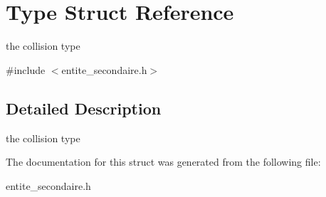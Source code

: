 \hypertarget{structType}{}\section{Type Struct Reference}
\label{structType}


the collision type  




{\ttfamily \#include $<$entite\+\_\+secondaire.\+h$>$}



\subsection{Detailed Description}
the collision type 

The documentation for this struct was generated from the following file\+:\begin{DoxyCompactItemize}
\item 
entite\+\_\+secondaire.\+h\end{DoxyCompactItemize}
